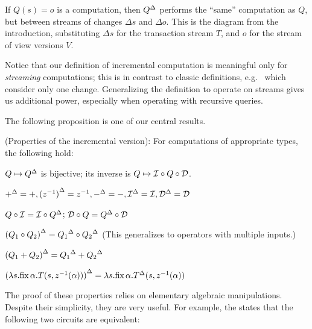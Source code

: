 If $Q(s) = o$ is a computation, then ${Q}^{\Delta}$ performs 
the ``same'' computation as $Q$,
but between streams of changes $\Delta s$ and $\Delta o$.
This is the diagram from the
introduction, substituting $\Delta s$ for the transaction stream $T$, 
and $o$ for the stream of view versions $V$.

Notice that our definition of incremental computation is meaningful only for \emph{streaming}
computations; this is in contrast to classic definitions, e.g.~\cite{gupta-idb95} which
consider only one change.  Generalizing the definition to operate on streams gives us
additional power, especially when operating with recursive queries.

The following proposition is one of our central results.

\begin{proposition}(Properties of the incremental version):
For computations of appropriate types, the following hold:
\label{prop-inc-properties}
\begin{description}[nosep, leftmargin=\parindent]
\item[inversion:] $Q\mapsto{Q}^{\Delta}$ is bijective; its inverse is $Q\mapsto \mathcal{I}\circ Q\circ\mathcal{D}$.
\item[invariance:] ${+}^{\Delta} = +, {(z^{-1})}^{\Delta} = z^{-1}, {-}^{\Delta} = -, {\mathcal{I}}^{\Delta}=\mathcal{I}, {\mathcal{D}}^{\Delta}=\mathcal{D}$
\item[push/pull:] \label{prop-part-commutation}
    $Q \circ \mathcal{I} = \mathcal{I} \circ {Q}^{\Delta}$; $\mathcal{D}\circ Q = {Q}^{\Delta}\circ\mathcal{D}$
\item[chain:] ${(Q_1\circ Q_2)}^{\Delta} = {Q_1}^{\Delta}\circ{Q_2}^{\Delta}$ (This generalizes to operators with multiple inputs.)
\item[add:] ${(Q_1 + Q_2)}^{\Delta} = {Q_1}^{\Delta} + {Q_2}^{\Delta}$
\item[cycle:] ${(\lambda s. \mbox{fix}\,\alpha.T(s,z^{-1}(\alpha)))}^{\Delta} = \lambda s. \mbox{fix}\,\alpha.{T}^{\Delta}(s,z^{-1}(\alpha))$
\end{description}
\end{proposition}

The proof of these properties relies on elementary algebraic manipulations.
Despite their simplicity, they are very useful.
For example, the   states that the following two circuits are equivalent:


